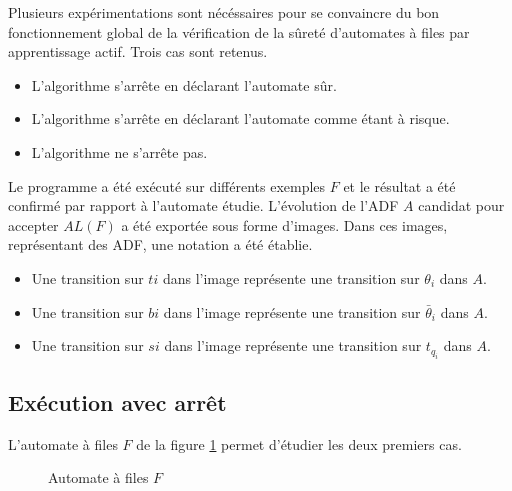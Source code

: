Plusieurs expérimentations sont nécéssaires pour se convaincre du bon fonctionnement global de la vérification de la sûreté d'automates à files par apprentissage actif. Trois cas sont retenus.
\begin{itemize}
  \item L'algorithme s'arrête en déclarant l'automate sûr.
  \item L'algorithme s'arrête en déclarant l'automate comme étant à risque.
  \item L'algorithme ne s'arrête pas.
\end{itemize}

Le programme a été exécuté sur différents exemples $F$ et le résultat a été confirmé par rapport à l'automate étudie. L'évolution de l'ADF $A$ candidat pour accepter $AL(F)$ a été exportée sous forme d'images. Dans ces images, représentant des ADF, une notation a été établie.
\begin{itemize}
  \item Une transition sur $ti$ dans l'image représente une transition sur $\theta_i$ dans $A$.
  \item Une transition sur $bi$ dans l'image représente une transition sur $\bar{\theta}_i$ dans $A$.
  \item Une transition sur $si$ dans l'image représente une transition sur $t_{q_i}$ dans $A$.
\end{itemize}



\subsection{Exécution avec arrêt}

L'automate à files $F$ de la figure \ref{fig:fex2} permet d'étudier les deux premiers cas.

\begin{figure}[H]
    \centering
    \caption{Automate à files $F$}\label{fig:fex2}
\end{figure}

